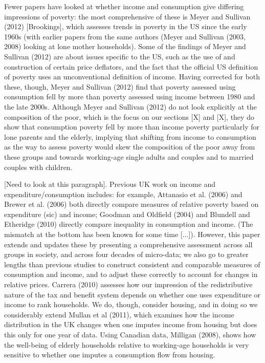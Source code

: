Fewer papers have looked at whether income and consumption give differing impressions of poverty: the most comprehensive of these is Meyer and Sullivan (2012) [Brookings], which assesses trends in poverty in the US since the early 1960s (with earlier papers from the same authors (Meyer and Sullivan (2003, 2008) looking at lone mother households). Some of the findings of Meyer and Sullivan (2012) are about issues specific to the US, such as the use of and construction of certain price deflators, and the fact that the official US definition of poverty uses an unconventional definition of income. Having corrected for both these, though, Meyer and Sullivan (2012) find that poverty assessed using consumption fell by more than poverty assessed using income between 1980 and the late 2000s. Although Meyer and Sullivan (2012) do not look explicitly at the composition of the poor, which is the focus on our sections [X] and [X], they do show that consumption poverty fell by more than income poverty particularly for lone parents and the elderly, implying that shifting from income to consumption as the way to assess poverty would skew the composition of the poor away from these groups and towards working-age single adults and couples and to married couples with children.

[Need to look at this paragraph]. Previous UK work on income and expenditure/consumption includes: for example, Attanasio et al. (2006) and Brewer et al. (2006) both directly compare measures of relative poverty based on expenditure (sic) and income; Goodman and Oldfield (2004) and Blundell and Etheridge (2010) directly compare inequality in consumption and income. (The mismatch at the bottom has been known for some time [...]). However, this paper extends and updates these by presenting a comprehensive assessment across all groups in society, and across four decades of micro-data; we also go to greater lengths than previous studies to construct consistent and comparable measures of consumption and income, and to adjust these correctly to account for changes in relative prices. Carrera (2010) assesses how our impression of the redistributive nature of the tax and benefit system depends on whether one uses expenditure or income to rank households. We do, though, consider housing, and in doing so we considerably extend Mullan et al (2011), which examines how the income distribution in the UK changes when one imputes income from housing but does this only for one year of data. Using Canadian data, Milligan (2008), shows how the well-being of elderly households relative to working-age households is very sensitive to whether one imputes a consumption flow from housing. 

